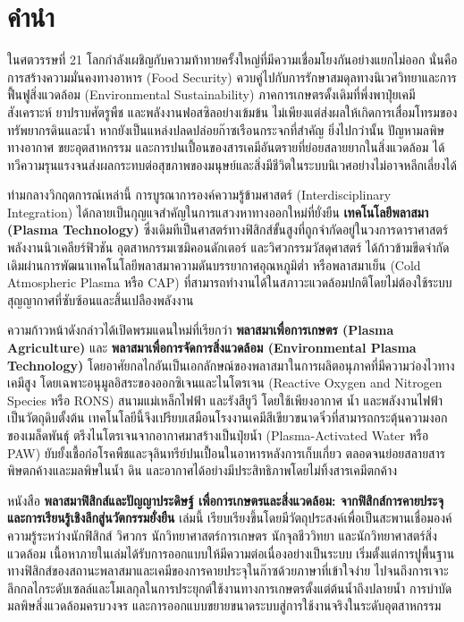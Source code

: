 \chapter*{คำนำ}

ในศตวรรษที่ 21 โลกกำลังเผชิญกับความท้าทายครั้งใหญ่ที่มีความเชื่อมโยงกันอย่างแยกไม่ออก นั่นคือการสร้างความมั่นคงทางอาหาร (Food Security) ควบคู่ไปกับการรักษาสมดุลทางนิเวศวิทยาและการฟื้นฟูสิ่งแวดล้อม (Environmental Sustainability) ภาคการเกษตรดั้งเดิมที่พึ่งพาปุ๋ยเคมีสังเคราะห์ ยาปราบศัตรูพืช และพลังงานฟอสซิลอย่างเข้มข้น ไม่เพียงแต่ส่งผลให้เกิดการเสื่อมโทรมของทรัพยากรดินและน้ำ หากยังเป็นแหล่งปลดปล่อยก๊าซเรือนกระจกที่สำคัญ ยิ่งไปกว่านั้น ปัญหามลพิษทางอากาศ ขยะอุตสาหกรรม และการปนเปื้อนของสารเคมีอันตรายที่ย่อยสลายยากในสิ่งแวดล้อม ได้ทวีความรุนแรงจนส่งผลกระทบต่อสุขภาพของมนุษย์และสิ่งมีชีวิตในระบบนิเวศอย่างไม่อาจหลีกเลี่ยงได้

ท่ามกลางวิกฤตการณ์เหล่านี้ การบูรณาการองค์ความรู้ข้ามศาสตร์ (Interdisciplinary Integration) ได้กลายเป็นกุญแจสำคัญในการแสวงหาทางออกใหม่ที่ยั่งยืน \textbf{เทคโนโลยีพลาสมา (Plasma Technology)} ซึ่งเดิมทีเป็นศาสตร์ทางฟิสิกส์ขั้นสูงที่ถูกจำกัดอยู่ในวงการดาราศาสตร์ พลังงานนิวเคลียร์ฟิวชัน อุตสาหกรรมเซมิคอนดักเตอร์ และวิศวกรรมวัสดุศาสตร์ ได้ก้าวข้ามขีดจำกัดเดิมผ่านการพัฒนาเทคโนโลยีพลาสมาความดันบรรยากาศอุณหภูมิต่ำ หรือพลาสมาเย็น (Cold Atmospheric Plasma หรือ CAP) ที่สามารถทำงานได้ในสภาวะแวดล้อมปกติโดยไม่ต้องใช้ระบบสุญญากาศที่ซับซ้อนและสิ้นเปลืองพลังงาน

ความก้าวหน้าดังกล่าวได้เปิดพรมแดนใหม่ที่เรียกว่า \textbf{พลาสมาเพื่อการเกษตร (Plasma Agriculture)} และ \textbf{พลาสมาเพื่อการจัดการสิ่งแวดล้อม (Environmental Plasma Technology)} โดยอาศัยกลไกอันเป็นเอกลักษณ์ของพลาสมาในการผลิตอนุภาคที่มีความว่องไวทางเคมีสูง โดยเฉพาะอนุมูลอิสระของออกซิเจนและไนโตรเจน (Reactive Oxygen and Nitrogen Species หรือ RONS) สนามแม่เหล็กไฟฟ้า และรังสียูวี โดยใช้เพียงอากาศ น้ำ และพลังงานไฟฟ้าเป็นวัตถุดิบตั้งต้น เทคโนโลยีนี้จึงเปรียบเสมือนโรงงานเคมีสีเขียวขนาดจิ๋วที่สามารถกระตุ้นความงอกของเมล็ดพันธุ์ ตรึงไนโตรเจนจากอากาศมาสร้างเป็นปุ๋ยน้ำ (Plasma-Activated Water หรือ PAW) ยับยั้งเชื้อก่อโรคพืชและจุลินทรีย์ปนเปื้อนในอาหารหลังการเก็บเกี่ยว ตลอดจนย่อยสลายสารพิษตกค้างและมลพิษในน้ำ ดิน และอากาศได้อย่างมีประสิทธิภาพโดยไม่ทิ้งสารเคมีตกค้าง

หนังสือ \textbf{พลาสมาฟิสิกส์และปัญญาประดิษฐ์ เพื่อการเกษตรและสิ่งแวดล้อม: จากฟิสิกส์การคายประจุและการเรียนรู้เชิงลึกสู่นวัตกรรมยั่งยืน} เล่มนี้ เรียบเรียงขึ้นโดยมีวัตถุประสงค์เพื่อเป็นสะพานเชื่อมองค์ความรู้ระหว่างนักฟิสิกส์ วิศวกร นักวิทยาศาสตร์การเกษตร นักจุลชีววิทยา และนักวิทยาศาสตร์สิ่งแวดล้อม เนื้อหาภายในเล่มได้รับการออกแบบให้มีความต่อเนื่องอย่างเป็นระบบ เริ่มตั้งแต่การปูพื้นฐานทางฟิสิกส์ของสถานะพลาสมาและเคมีของการคายประจุในก๊าซด้วยภาษาที่เข้าใจง่าย ไปจนถึงการเจาะลึกกลไกระดับเซลล์และโมเลกุลในการประยุกต์ใช้งานทางการเกษตรตั้งแต่ต้นน้ำถึงปลายน้ำ การบำบัดมลพิษสิ่งแวดล้อมครบวงจร และการออกแบบขยายขนาดระบบสู่การใช้งานจริงในระดับอุตสาหกรรม

